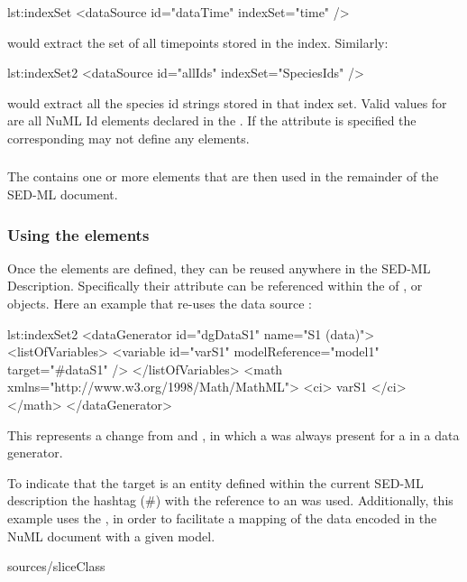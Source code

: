%
\begin{myXmlLst}{}{lst:indexSet}
        <dataSource id="dataTime" indexSet="time" />
\end{myXmlLst} 
%

would extract the set of all timepoints stored in the index. Similarly: 


%
\begin{myXmlLst}{}{lst:indexSet2}
        <dataSource id="allIds" indexSet="SpeciesIds" />
\end{myXmlLst} 
%

would extract all the species id strings stored in that index set. Valid values for  are all NuML Id elements declared in the . If the  attribute is specified the corresponding  may not define any  elements.

\subsubsection{}
\label{class:listOfSlices}
The  contains one or more \SedSlice elements that are then used in the remainder of the SED-ML document.

\subsubsection{Using the  elements}
Once the \SedDataSource elements are defined, they can be reused anywhere in the SED-ML Description. Specifically their  attribute can be referenced within the  of ,  or  objects. Here an example that re-uses the data source :


%
\begin{myXmlLst}{}{lst:indexSet2}
   <dataGenerator id="dgDataS1" name="S1 (data)">
     <listOfVariables>
       <variable id="varS1" modelReference="model1" target="#dataS1" />
     </listOfVariables>
     <math xmlns="http://www.w3.org/1998/Math/MathML">
       <ci> varS1 </ci>
     </math>
   </dataGenerator>
\end{myXmlLst} 
%

This represents a change from \LoneVone and \LoneVtwo, in which a  was always present for a  in a data generator.

To indicate that the target is an entity defined within the current SED-ML description the hashtag (\#) with the reference to an  was used. Additionally, this example uses the , in order to facilitate a mapping of the data encoded in the NuML document with a given model. 

 {sources/sliceClass}

